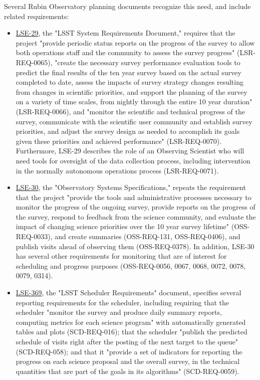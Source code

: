Several Rubin Observatory planning documents recognize this need, and include related requirements:
\begin{itemize}
\item \href{https://ls.st/lse-29}{LSE-29}, the "LSST System Requirements Document," requires that the project "provide periodic status reports on the progress of the survey to allow both operations staff and the community to assess the survey progress" (LSR-REQ-0065), "create the necessary survey performance evaluation tools to predict the final results of the ten year survey based on the actual survey completed to date, assess the impacts of survey strategy changes resulting from changes in scientific priorities, and support the planning of the survey on a variety of time scales, from nightly through the entire 10 year duration" (LSR-REQ-0066), and "monitor the scientific and technical progress of the survey, communicate with the scientific user community and establish survey priorities, and adjust the survey design as needed to accomplish its goals given these priorities and achieved performance" (LSR-REQ-0070). Furthermore, LSE-29 describes the role of an Observing Scientist who will need tools for oversight of the data collection process, including intervention in the normally autonomous operations process (LSR-REQ-0071).
\item \href{https://ls.st/lse-30}{LSE-30}, the "Observatory Systems Specifications," repeats the requirement that the project "provide the tools and administrative processes necessary to monitor the progress of the ongoing survey, provide reports on the progress of the survey, respond to feedback from the science community, and evaluate the impact of changing science priorities over the 10 year survey lifetime" (OSS-REQ-0033), and create summaries (OSS-REQ-131, OSS-REQ-0406), and publish visits ahead of observing them (OSS-REQ-0378). In addition, LSE-30 has several other requirements for monitoring that are of interest for scheduling and progress purposes (OSS-REQ-0056, 0067, 0068, 0072, 0078, 0079, 0314).
\item \href{https://ls.st/lse-369}{LSE-369}, the "LSST Scheduler Requirements" document, specifies several reporting requirements for the scheduler, including requiring that the scheduler "monitor the survey and produce daily summary reports, computing metrics for each science program" with automatically generated tables and plots (SCD-REQ-016); that the scheduler "publish the predicted schedule of visits right after the posting of the next target to the queue" (SCD-REQ-058); and that it "provide a set of indicators for reporting the progress on each science proposal and the overall survey, in the technical quantities that are part of the goals in its algorithms" (SCD-REQ-0059).
\end{itemize}
